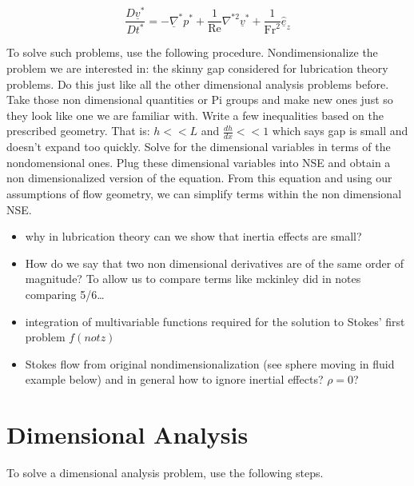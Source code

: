 \begin{equation*}
  \frac{D\underline{v}^{*}}{Dt^{*}}=-\underline{\nabla}^{*}p^{*}+\frac{1}{\text{Re}}\nabla^{*2}\underline{v}^{*}+\frac{1}{\text{Fr}^{2}}\underline{\hat{e}}_{z}
\end{equation*}

To solve such problems, use the following procedure.
Nondimensionalize the problem we are interested in: the skinny gap considered for lubrication theory problems.
Do this just like all the other dimensional analysis problems before.
Take those non dimensional quantities or Pi groups and make new ones just so they look like one we are familiar with.
Write a few inequalities based on the prescribed geometry.
That is: $h<<L$ and $\frac{dh}{dx}<<1$ which says gap is small and doesn't expand too quickly.
Solve for the dimensional variables in terms of the nondomensional ones.
Plug these dimensional variables into NSE and obtain a non dimensionalized version of the equation.
From this equation and using our assumptions of flow geometry, we can simplify terms within the non dimensional NSE.\@

\begin{itemize}
  \item{why in lubrication theory can we show that inertia effects are small?}
  \item{How do we say that two non dimensional derivatives are of the same order of magnitude? To allow us to compare terms like mckinley did in notes comparing 5/6\ldots}
  \item{integration of multivariable functions required for the solution to Stokes' first problem $f(not z)$}
  \item{Stokes flow from original nondimensionalization (see sphere moving in fluid example below) and in general how to ignore inertial effects? $\rho=0$?}
\end{itemize}

\chapter{Dimensional Analysis}

To solve a dimensional analysis problem, use the following steps.


